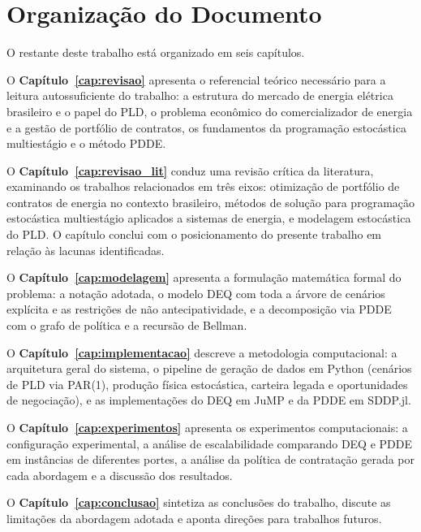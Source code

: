 \section{Organização do Documento}
\label{sec:organizacao}

O restante deste trabalho está organizado em seis capítulos.

O \textbf{Capítulo~\ref{cap:revisao}} apresenta o referencial teórico necessário para a leitura autossuficiente do trabalho: a estrutura do mercado de energia elétrica brasileiro e o papel do PLD, o problema econômico do comercializador de energia e a gestão de portfólio de contratos, os fundamentos da programação estocástica multiestágio e o método PDDE.

O \textbf{Capítulo~\ref{cap:revisao_lit}} conduz uma revisão crítica da literatura, examinando os trabalhos relacionados em três eixos: otimização de portfólio de contratos de energia no contexto brasileiro, métodos de solução para programação estocástica multiestágio aplicados a sistemas de energia, e modelagem estocástica do PLD. O capítulo conclui com o posicionamento do presente trabalho em relação às lacunas identificadas.

O \textbf{Capítulo~\ref{cap:modelagem}} apresenta a formulação matemática formal do problema: a notação adotada, o modelo DEQ com toda a árvore de cenários explícita e as restrições de não antecipatividade, e a decomposição via PDDE com o grafo de política e a recursão de Bellman.

O \textbf{Capítulo~\ref{cap:implementacao}} descreve a metodologia computacional: a arquitetura geral do sistema, o pipeline de geração de dados em Python (cenários de PLD via PAR(1), produção física estocástica, carteira legada e oportunidades de negociação), e as implementações do DEQ em JuMP e da PDDE em SDDP.jl.

O \textbf{Capítulo~\ref{cap:experimentos}} apresenta os experimentos computacionais: a configuração experimental, a análise de escalabilidade comparando DEQ e PDDE em instâncias de diferentes portes, a análise da política de contratação gerada por cada abordagem e a discussão dos resultados.

O \textbf{Capítulo~\ref{cap:conclusao}} sintetiza as conclusões do trabalho, discute as limitações da abordagem adotada e aponta direções para trabalhos futuros.

